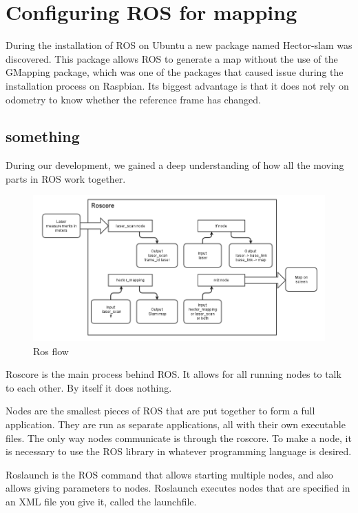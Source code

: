 \clearpage
\section{Configuring ROS for mapping}

During the installation of ROS on Ubuntu a new package named Hector-slam was discovered.
This package allows ROS to generate a map without the use of the GMapping package, which was one of the packages that caused issue during the installation process on Raspbian. Its biggest advantage is that it does not rely on odometry to know whether the reference frame has changed.

\subsection{something}
During our development, we gained a deep understanding of how all the moving parts in ROS work together.


\begin{figure}[H]
	\centering
	\includegraphics[width=1\linewidth]{images/ROSflow.png}
	\caption{Ros flow}
\end{figure}

Roscore is the main process behind ROS. It allows for all running nodes to talk to each other. By itself it does nothing.

Nodes are the smallest pieces of ROS that are put together to form a full application. They are run as separate applications, all with their own executable files. The only way nodes communicate is through the roscore. To make a node, it is necessary to use the ROS library in whatever programming language is desired.

Roslaunch is the ROS command that allows starting multiple nodes, and also allows giving parameters to nodes. Roslaunch executes nodes that are specified in an XML file you give it, called the launchfile.


